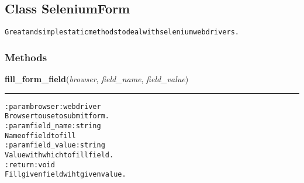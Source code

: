 \subsection{Class SeleniumForm}

    \label{hal:internet:selenium:SeleniumForm}
\begin{alltt}
Great and simple static methods to deal with selenium webdrivers. 
\end{alltt}



  \subsubsection{Methods}

    \label{hal:internet:selenium:SeleniumForm:fill_form_field}

    \vspace{0.5ex}

\hspace{.8\funcindent}\begin{boxedminipage}{\funcwidth}

    \raggedright \textbf{fill\_form\_field}(\textit{browser}, \textit{field\_name}, \textit{field\_value})

    \vspace{-1.5ex}

    \rule{\textwidth}{0.5\fboxrule}
\setlength{\parskip}{2ex}
\begin{alltt}

:param browser: webdriver
    Browser to use to submit form.
:param field\_name :string
    Name of field to fill
:param field\_value: string
    Value with which to fill field.
:return: void
    Fill given field wiht given value.
\end{alltt}

\setlength{\parskip}{1ex}
    \end{boxedminipage}

    \label{hal:internet:selenium:SeleniumForm:fill_login_form}

